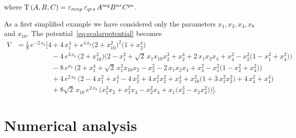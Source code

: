 \documentclass[11pt]{article}
\begin{document}
where ${\rm T}\left(A,B,C\right)=\varepsilon_{mnp}\,\varepsilon_{qrs}\,A^{mq}B^{nr}C^{ps}$.

As a first simplified example we have considered only the parameters $x_{1}, x_{2}, x_{4}, x_{8}$ and $x_{10}$. The potential~\eqref{eq:scalarpotential} becomes
\begin{equation} \label{eq:scalarpotential124810}
	\begin{aligned}
		V &= \frac{1}{8}\, e^{-2\,x_{8}} \bigg[4 + 4\,x_{1}^4 + e^{4\,x_{8}} \big(2 + x_{10}^2\big)^2 \big(1 + x_{2}^4\big)\\
		  & \quad\qquad\qquad - 4\,e^{3\,x_{8}}\,\big(2 + x_{10}^2\big) \Big(2 - x_{1}^2 + \sqrt{2}\,x_{1} x_{10} x_{2}^3 + x_{2}^4 + 
      			2\,x_{1} x_{2} x_{4} + x_{4}^2 - x_{2}^2 \big(1 - x_{1}^2 + x_{4}^2\big)\Big)\\
        & \quad\qquad\qquad - 8\,e^{x_{8}}\,\Big(2 + x_{1}^4 + \sqrt{2}\,x_{1}^3 x_{10} x_{2} - x_{2}^2 - 2\,x_{1} x_{2} x_{4} + 
      			x_{4}^2 - x_{1}^2 \big(1 - x_{2}^2 + x_{4}^2\big)\Big)\\
        & \quad\qquad\qquad + 4\,e^{2\,x_{8}}\,\Big(2 - 4\,x_{1}^2 + x_{1}^4 - 4\,x_{2}^2 + 4\,x_{1}^2 x_{2}^2 + x_{2}^4
        			+ x_{10}^2\big(1 + 3\,x_{1}^2 x_{2}^2\big) + 4\,x_{4}^2 + x_{4}^4\Big)\\
        & \quad\qquad\qquad + 8\sqrt{2}\,x_{10}\,e^{2\,x_{8}}\,\Big(x_{1}^3 x_{2} + x_{1}^2 x_{4} - x_{2}^2 x_{4} + x_{1} \big(x_{2}^3 - x_{2} x_{4}^2\big)\Big)\bigg].
	\end{aligned}
\end{equation}

\section{Numerical analysis}
\end{document}
